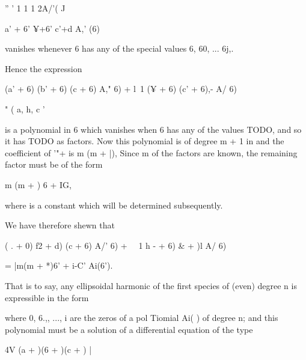 '' ' 1 1 1 2A/'( J

a' + 6' ¥+6' c'+d A,' (6)

vanishes whenever 6 has any of the special values 6, 60, ... 6j,.

Hence the expression

(a' + 6) (b' + 6) (c + 6) A," 6) + l\ 1 (¥ + 6) (c' + 6),- A/ 6)

" ( a, h, c '

%
%

is a polynomial in 6 which vanishes when 6 has any of the values 
TODO, and so it has TODO as factors. Now this
polynomial is of degree m + 1 in and the coefficient of '"+ is m (m +
|), Since m of the factors are known, the remaining factor must be of
the form

m (m + ) 6 + IG,

where is a constant which will be determined subsequently.

We have therefore shewn that

( . + 0) f2 + d) (c + 6) A/' 6) + \ \ 1 h - + 6) \& + )l A/ 6)

= |m(m + *)6' + i-C' Ai(6').

That is to say, any ellipsoidal harmonic of the first species of
(even) degree n is expressible in the form

where 0, 6.,, ..., i are the zeros of a pol Tiomial Ai( ) of degree
n; and this polynomial must be a solution of a differential equation
of the type

4V (a + )(6 + )(c + ) |

